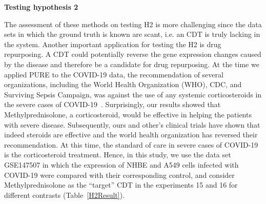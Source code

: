 \textbf{Testing hypothesis 2}


The assessment of these methods on testing H2 is more challenging since the data sets in which the ground truth is known are scant, i.e. an CDT is truly lacking in the system. Another important application for testing the H2 is drug repurposing. A CDT could potentially reverse the  gene expression changes caused by the disease and therefore be a candidate for drug repurposing. 
At the time we applied PURE to the COVID-19 data, the recommendation of several organizations, including the World Health Organization (WHO), CDC, and Surviving Sepsis Campaign, was against the use of any systemic corticosteroids in the severe cases of COVID-19~\cite{wilson2020covid}. Surprisingly, our results showed that Methylprednisolone, a corticosteroid, would be effective in helping the patients with severe disease\cite{DraghiciCOVID:2021}. Subsequently, ours and other's clinical trials have shown that indeed steroids are effective and the world health organization has reversed their recommendation\cite{meduri2020pharmacological, corral2021methylprednisolone,salton2020prolonged, meduri2020pharmacological, cochrane1996systemic, prescott2020corticosteroids}. At this time, the standard of care in severe cases of COVID-19 is the corticosteroid treatment. 
Hence, in this study, we use the data set GSE147507 in which the expression of NHBE and A549 cells infected with COVID-19 were compared with their corresponding control, and consider Methylprednisolone as the ``target'' CDT in the experiments 15 and 16 for different contrasts (Table~\ref{H2Result}).

